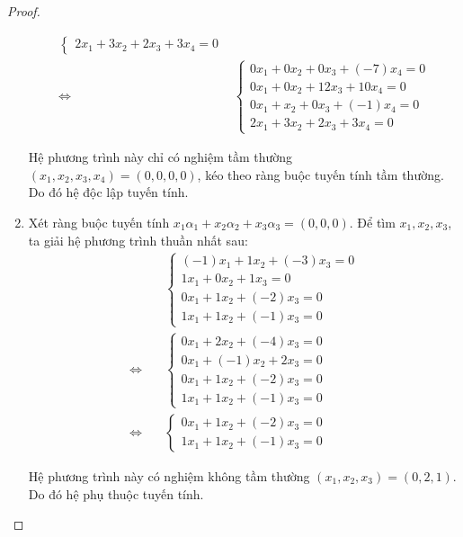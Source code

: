 \documentclass[class=linearalgebra,crop=false]{standalone}
\begin{document}
\begin{proof}
\begin{enumerate}[label = (\alph*)]
\begin{align*}
\begin{cases}
                      2x_{1} + 3x_{2} + 2x_{3} + 3x_{4} = 0
                  \end{cases}                        \\
                  \Leftrightarrow\quad &
                  \begin{cases}
                      0x_{1} + 0x_{2} + 0x_{3} + (-7)x_{4} = 0 \\
                      0x_{1} + 0x_{2} + 12x_{3} + 10x_{4} = 0  \\
                      0x_{1} + x_{2} + 0x_{3} + (-1)x_{4} = 0  \\
                      2x_{1} + 3x_{2} + 2x_{3} + 3x_{4} = 0
                  \end{cases}
              \end{align*}
              \par Hệ phương trình này chỉ có nghiệm tầm thường $(x_{1}, x_{2}, x_{3}, x_{4}) = (0, 0, 0, 0)$, kéo theo ràng buộc tuyến tính tầm thường. Do đó hệ độc lập tuyến tính.
        \item Xét ràng buộc tuyến tính $x_{1}\alpha_{1} + x_{2}\alpha_{2} + x_{3}\alpha_{3} = (0, 0, 0)$. Để tìm $x_{1}, x_{2}, x_{3}$, ta giải hệ phương trình thuần nhất sau:
              \begin{align*}
                                       & \begin{cases}
                      (-1)x_{1} + 1x_{2} + (-3)x_{3} = 0 \\
                      1x_{1} + 0x_{2} + 1x_{3} = 0       \\
                      0x_{1} + 1x_{2} + (-2)x_{3} = 0    \\
                      1x_{1} + 1x_{2} + (-1)x_{3} = 0
                  \end{cases} \\
                  \Leftrightarrow\quad &
                  \begin{cases}
                      0x_{1} + 2x_{2} + (-4)x_{3} = 0 \\
                      0x_{1} + (-1)x_{2} + 2x_{3} = 0 \\
                      0x_{1} + 1x_{2} + (-2)x_{3} = 0 \\
                      1x_{1} + 1x_{2} + (-1)x_{3} = 0
                  \end{cases}                        \\
                  \Leftrightarrow\quad &
                  \begin{cases}
                      0x_{1} + 1x_{2} + (-2)x_{3} = 0 \\
                      1x_{1} + 1x_{2} + (-1)x_{3} = 0
                  \end{cases}
              \end{align*}
              \par Hệ phương trình này có nghiệm không tầm thường $(x_{1}, x_{2}, x_{3}) = (0, 2, 1)$. Do đó hệ phụ thuộc tuyến tính.
    \end{enumerate}
\end{proof}
\end{document}
